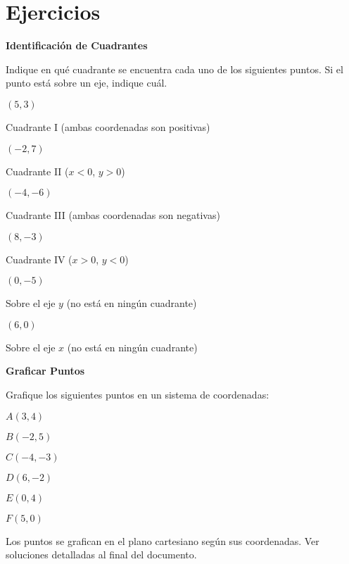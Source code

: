 
\section{Ejercicios}

\begin{exercise}
\textbf{Identificación de Cuadrantes}

Indique en qué cuadrante se encuentra cada uno de los siguientes puntos. Si el punto está sobre un eje, indique cuál.

\problem $(5, 3)$
\begin{solucion}
Cuadrante I (ambas coordenadas son positivas)
\end{solucion}

\problem $(-2, 7)$
\begin{solucion}
Cuadrante II ($x < 0$, $y > 0$)
\end{solucion}

\problem $(-4, -6)$
\begin{solucion}
Cuadrante III (ambas coordenadas son negativas)
\end{solucion}

\problem $(8, -3)$
\begin{solucion}
Cuadrante IV ($x > 0$, $y < 0$)
\end{solucion}

\problem $(0, -5)$
\begin{solucion}
Sobre el eje $y$ (no está en ningún cuadrante)
\end{solucion}

\problem $(6, 0)$
\begin{solucion}
Sobre el eje $x$ (no está en ningún cuadrante)
\end{solucion}
\end{exercise}

\begin{exercise}
\textbf{Graficar Puntos}

Grafique los siguientes puntos en un sistema de coordenadas:

\begin{exerciselist}
    \item $A(3, 4)$
    \item $B(-2, 5)$
    \item $C(-4, -3)$
    \item $D(6, -2)$
    \item $E(0, 4)$
    \item $F(5, 0)$
\end{exerciselist}

\begin{solucion}
Los puntos se grafican en el plano cartesiano según sus coordenadas. Ver soluciones detalladas al final del documento.
\end{solucion}
\end{exercise}

